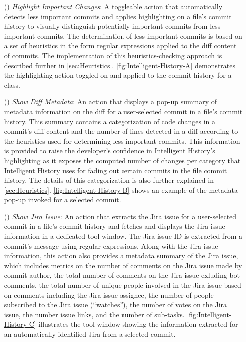 \begin{itemize}
    \item[(\feature{1})] \textit{Highlight Important Changes}: A toggleable action that automatically detects less important commits and applies highlighting on a file's commit history to visually distinguish potentially important commits from less important commits. The determination of less important commits is based on a set of heuristics in the form regular expressions applied to the diff content of commits. The implementation of this heuristics-checking approach is described further in \autoref{sec:Heuristics}. \autoref{fig:Intelligent-History-A} demonstrates the highlighting action toggled on and applied to the commit history for a class.
    \item[(\feature{2})] \textit{Show Diff Metadata}: An action that displays a pop-up summary of metadata information on the diff for a user-selected commit in a file's commit history. This summary contains a categorization of code changes in a commit's diff content and the number of lines detected in a diff according to the heuristics used for determining less important commits. This information is provided to raise the developer's confidence in Intelligent History's highlighting as it exposes the computed number of changes per category that Intelligent History uses for fading out certain commits in the file commit history. The details of this categorization is also further explained in \autoref{sec:Heuristics}. \autoref{fig:Intelligent-History-B} shows an example of the metadata pop-up invoked for a selected commit.
    \item[(\feature{3})] \textit{Show Jira Issue}: An action that extracts the Jira issue  for a user-selected commit in a file's commit history and fetches and displays the Jira issue information in a dedicated tool window. The Jira issue ID is extracted from a commit's message using regular expressions. Along with the Jira issue information, this action also provides a metadata summary of the Jira issue, which includes metrics on the number of comments on the Jira issue made by commit author, the total number of comments on the Jira issue exluding bot comments, the total number of unique people involved in the Jira issue based on comments including the Jira issue assignee, the number of people subscribed to the Jira issue (``watches''), the number of votes on the Jira issue, the number issue links, and the number of sub-tasks. \autoref{fig:Intelligent-History-C} illustrates the tool window showing the information extracted for an automatically identified Jira  from a selected commit.
\end{itemize}

